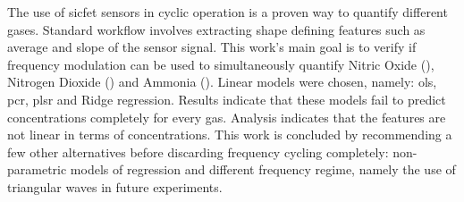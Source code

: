 The use of \acrfull{sicfet} sensors  in cyclic operation is a proven way to quantify different gases. Standard workflow involves extracting shape defining features such as average and slope of the sensor signal. This work's main goal is to verify if frequency modulation can be used to simultaneously quantify Nitric Oxide (), Nitrogen Dioxide () and Ammonia (). Linear models were chosen, namely: \acrfull{ols}, \acrfull{pcr}, \acrfull{plsr} and Ridge regression. Results indicate that these models fail to predict concentrations completely for every gas. Analysis indicates that the features are not linear in terms of concentrations. This work is concluded by recommending a few other alternatives before discarding frequency cycling completely: non-parametric models of regression and different frequency regime, namely the use of triangular waves in future experiments.